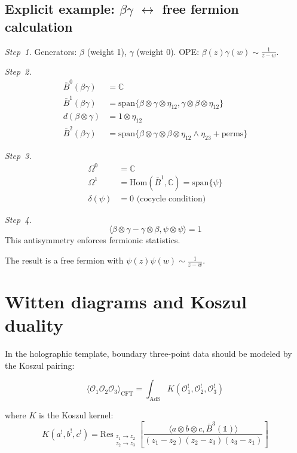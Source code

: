 \subsection{\texorpdfstring{Explicit example: $\beta\gamma$ $\leftrightarrow$ free fermion calculation}{Explicit example: free fermion calculation}}

\begin{calculation}
\emph{Step~1.}
Generators: $\beta$ (weight 1), $\gamma$ (weight 0).
OPE: $\beta(z)\gamma(w) \sim \frac{1}{z-w}$.

\emph{Step~2.}
\begin{align}
\bar{B}^0(\beta\gamma) &= \mathbb{C} \\
\bar{B}^1(\beta\gamma) &= \text{span}\{\beta \otimes \gamma \otimes \eta_{12}, \gamma \otimes \beta \otimes \eta_{12}\} \\
d(\beta \otimes \gamma) &= 1 \otimes \eta_{12} \\
\bar{B}^2(\beta\gamma) &= \text{span}\{\beta \otimes \gamma \otimes \beta \otimes \eta_{12} \wedge \eta_{23} + \text{perms}\}
\end{align}

\emph{Step~3.}
\begin{align}
\Omega^0 &= \mathbb{C} \\
\Omega^1 &= \text{Hom}(\bar{B}^1, \mathbb{C}) = \text{span}\{\psi\} \\
\delta(\psi) &= 0 \text{ (cocycle condition)}
\end{align}

\emph{Step~4.}
\[\langle \beta \otimes \gamma - \gamma \otimes \beta, \psi \otimes \psi \rangle = 1\]
This antisymmetry enforces fermionic statistics.

The result is a free fermion with $\psi(z)\psi(w) \sim \frac{1}{z-w}$.
\end{calculation}

\section{Witten diagrams and Koszul duality}

\begin{technique}[Witten-diagram shadow = Koszul pairing]
In the holographic template, boundary three-point data should be
modeled by the Koszul pairing:

\[\langle \mathcal{O}_1 \mathcal{O}_2 \mathcal{O}_3 \rangle_{\text{CFT}} = \int_{\text{AdS}} K(\mathcal{O}_1^!, \mathcal{O}_2^!, \mathcal{O}_3^!)\]

where $K$ is the Koszul kernel:
\[K(a^!, b^!, c^!) = \text{Res}_{\substack{z_1 \to z_2 \\ z_2 \to z_3}} \left[\frac{\langle a \otimes b \otimes c, \bar{B}^3(\mathbb{1}) \rangle}{(z_1-z_2)(z_2-z_3)(z_3-z_1)}\right]\]
\end{technique}

